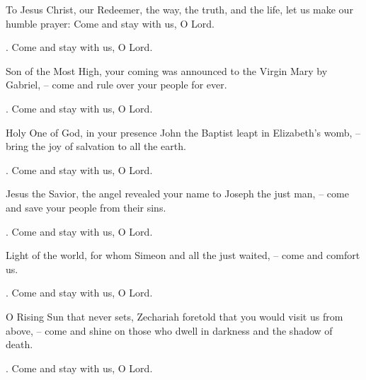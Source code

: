\lettrine[loversize=0.15,lines=2]{T}{}o Jesus Christ, our Redeemer, the way, the truth, and the life, let us make our humble prayer: Come and stay with us, O Lord.
\par \Rbar. Come and stay with us, O Lord.

Son of the Most High, your coming was announced to the Virgin Mary by Gabriel,
– come and rule over your people for ever.
\par \Rbar. Come and stay with us, O Lord.

Holy One of God, in your presence John the Baptist leapt in Elizabeth’s womb,
– bring the joy of salvation to all the earth.
\par \Rbar. Come and stay with us, O Lord.

Jesus the Savior, the angel revealed your name to Joseph the just man,
– come and save your people from their sins.
\par \Rbar. Come and stay with us, O Lord.

Light of the world, for whom Simeon and all the just waited,
– come and comfort us.
\par \Rbar. Come and stay with us, O Lord.

O Rising Sun that never sets, Zechariah foretold that you would visit us from above,
– come and shine on those who dwell in darkness and the shadow of death.
\par \Rbar. Come and stay with us, O Lord.

